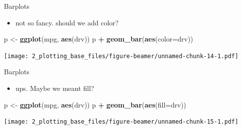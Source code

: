 \documentclass[
  ignorenonframetext,
]{beamer}
\newenvironment{Shaded}{\begin{snugshade}}{\end{snugshade}}
\newcommand{\DataTypeTok}[1]{\textcolor[rgb]{0.13,0.29,0.53}{#1}}
\newcommand{\KeywordTok}[1]{\textcolor[rgb]{0.13,0.29,0.53}{\textbf{#1}}}
\newcommand{\NormalTok}[1]{#1}
\newcommand{\OperatorTok}[1]{\textcolor[rgb]{0.81,0.36,0.00}{\textbf{#1}}}
\newcommand{\StringTok}[1]{\textcolor[rgb]{0.31,0.60,0.02}{#1}}
\providecommand{\tightlist}{%
  \setlength{\itemsep}{0pt}\setlength{\parskip}{0pt}}
\begin{document}
\begin{frame}[fragile]{Barplots}
\protect\hypertarget{barplots-1}{}

\begin{itemize}
\tightlist
\item
  not so fancy. should we add color?
\end{itemize}

\begin{Shaded}
\begin{Highlighting}[]
\NormalTok{p <-}\StringTok{ }\KeywordTok{ggplot}\NormalTok{(mpg, }\KeywordTok{aes}\NormalTok{(drv))}
\NormalTok{p }\OperatorTok{+}\StringTok{ }\KeywordTok{geom_bar}\NormalTok{(}\KeywordTok{aes}\NormalTok{(}\DataTypeTok{color=}\NormalTok{drv))}
\end{Highlighting}
\end{Shaded}

\texttt{[image: 2\_plotting\_base\_files/figure-beamer/unnamed-chunk-14-1.pdf]}

\end{frame}

\begin{frame}[fragile]{Barplots}
\protect\hypertarget{barplots-2}{}

\begin{itemize}
\tightlist
\item
  ups. Maybe we meant fill?
\end{itemize}

\begin{Shaded}
\begin{Highlighting}[]
\NormalTok{p <-}\StringTok{ }\KeywordTok{ggplot}\NormalTok{(mpg, }\KeywordTok{aes}\NormalTok{(drv))}
\NormalTok{p }\OperatorTok{+}\StringTok{ }\KeywordTok{geom_bar}\NormalTok{(}\KeywordTok{aes}\NormalTok{(}\DataTypeTok{fill=}\NormalTok{drv))}
\end{Highlighting}
\end{Shaded}

\texttt{[image: 2\_plotting\_base\_files/figure-beamer/unnamed-chunk-15-1.pdf]}

\end{frame}
\end{document}
